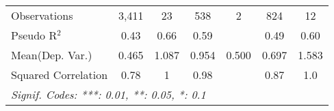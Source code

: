 \begin{tabular}{lcccccc}
   Observations                                               & 3,411         & 23          & 538           & 2    & 824           & 12\\  
   Pseudo R$^2$                                               & 0.43          & 0.66        & 0.59          &      & 0.49          & 0.60\\  
Mean(Dep. Var.) & 0.465 & 1.087 & 0.954 & 0.500 & 0.697 & 1.583 \\
   Squared Correlation                                        & 0.78          & 1           & 0.98          &      & 0.87          & 1.0\\  
   \midrule \midrule
   \multicolumn{7}{l}{\emph{Signif. Codes: ***: 0.01, **: 0.05, *: 0.1}}\\
\end{tabular}
\par\endgroup
